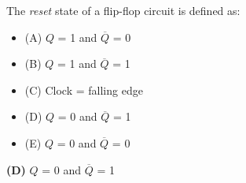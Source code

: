 

The {\it reset} state of a flip-flop circuit is defined as:

\begin{itemize}
\item{(A)} $Q$ = 1 and $\overline{Q}$ = 0
\vskip 5pt 
\item{(B)} $Q$ = 1 and $\overline{Q}$ = 1
\vskip 5pt 
\item{(C)} Clock = falling edge
\vskip 5pt 
\item{(D)} $Q$ = 0 and $\overline{Q}$ = 1
\vskip 5pt 
\item{(E)} $Q$ = 0 and $\overline{Q}$ = 0
\end{itemize}







{\bf (D)} $Q$ = 0 and $\overline{Q}$ = 1
 










